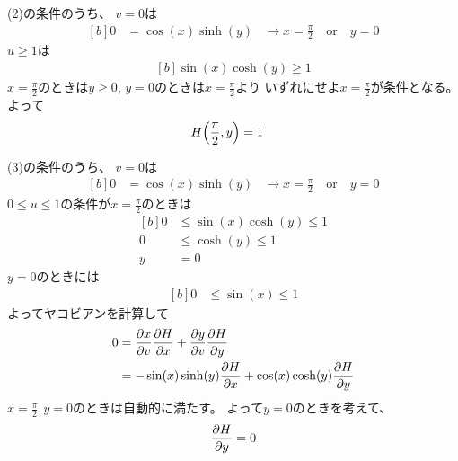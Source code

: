 \documentclass[../ap_2016.tex]{subfiles}
\begin{document}
(2)の条件のうち、
\(v=0\)は
\begin{equation}\begin{aligned}[b]
    0 &= \cos(x)\sinh(y) & \rightarrow x=\frac{\pi}{2}\quad\text{or}\quad y = 0
\end{aligned}\end{equation}
\(u\geq 1\)は
\begin{equation}\begin{aligned}[b]
    \sin(x)\cosh(y)\geq 1
\end{aligned}\end{equation}
\(x=\frac{\pi}{2}\)のときは\(y\geq0\), \(y=0\)のときは\(x=\frac{\pi}{2}\)より
いずれにせよ\(x=\frac{\pi}{2}\)が条件となる。
よって
\begin{equation}\begin{aligned}[b]
    H\qty(\frac{\pi}{2},y)&=1
\end{aligned}\end{equation}

(3)の条件のうち、
\(v=0\)は
\begin{equation}\begin{aligned}[b]
    0 &= \cos(x)\sinh(y) & \rightarrow x=\frac{\pi}{2}\quad\text{or}\quad y = 0
\end{aligned}\end{equation}
\(0\leq u\leq 1\)の条件が\(x=\frac{\pi}{2}\)のときは
\begin{equation}\begin{aligned}[b]
    0&\leq\sin(x)\cosh(y)\leq 1\\
     0&\leq\cosh(y)\leq 1\\
    y&= 0
\end{aligned}\end{equation}
\(y=0\)のときには
\begin{equation}\begin{aligned}[b]
    0&\leq\sin(x)\leq 1
\end{aligned}\end{equation}
よってヤコビアンを計算して
\begin{equation}\begin{aligned}[b]
    0 &= \pdv{x}{v}\pdv{H}{x}+\pdv{y}{v}\pdv{H}{y}\\
    &= -\sin(x)\sinh(y)\pdv{H}{x}+\cos(x)\cosh(y)\pdv{H}{y}
\end{aligned}\end{equation}
\(x=\frac{\pi}{2},y=0\)のときは自動的に満たす。
よって\(y=0\)のときを考えて、
\begin{equation}\begin{aligned}[b]
    \pdv{H}{y}(x,0)=0
\end{aligned}\end{equation}
\end{document}
